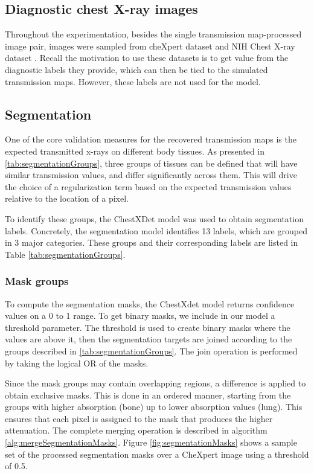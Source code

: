\documentclass[nomenclature, english, bibtex]{kththesis}
\numberwithin{listing}{chapter}
\begin{document}
\subsection{Diagnostic chest X-ray images}

Throughout the experimentation, besides the single transmission map-processed image pair, images were sampled from
cheXpert dataset \cite{chexpert} and NIH Chest X-ray dataset \cite{nih}. Recall the motivation to use these datasets
is to get value from the diagnostic labels they provide, which can then be tied to the simulated transmission maps.
However, these labels are not used for the model.

\subsection{Segmentation}
\label{sec:segmentation}

One of the core validation measures for the recovered transmission maps is the expected transmitted x-rays on
different body tissues. As presented in \autoref{tab:segmentationGroups}, three groups of tissues
can be defined that will have similar transmission values, and differ significantly across them. This
will drive the choice of a regularization term based on the expected transmission values relative to
the location of a pixel.

To identify these groups, the ChestXDet \cite{chestxdet} model was used to obtain segmentation labels.
Concretely, the segmentation model identifies 13 labels, which are grouped in 3 major categories.
These groups and their corresponding labels are listed in Table \ref{tab:segmentationGroups}.

\subsubsection{Mask groups}

To compute the segmentation masks, the ChestXdet model returns confidence values on a 0 to 1 range.
To get binary masks, we include in our model a threshold parameter. The threshold is used to create binary masks where
the values are above it, then the segmentation targets are joined according to the groups described in
\autoref{tab:segmentationGroups}. The join operation is performed by taking the logical
OR of the masks.

Since the mask groups may contain overlapping regions, a difference is applied to obtain exclusive masks. This is done in an ordered manner,
starting from the groups with higher absorption (bone) up to lower absorption values (lung). This ensures that each pixel is assigned to
the mask that produces the higher attenuation. The complete merging operation is described in algorithm \ref{alg:mergeSegmentationMasks}. Figure
\ref{fig:segmentationMasks} shows a sample set of the processed segmentation masks over a CheXpert image using a threshold of 0.5.
\end{document}
